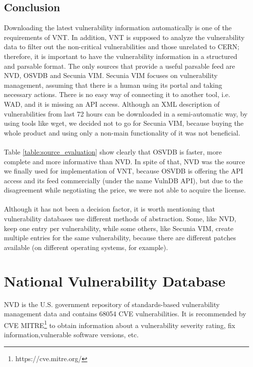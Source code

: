 \subsection{Conclusion}
Downloading the latest vulnerability information automatically is one of the requirements of VNT. In addition, VNT is supposed to analyze the vulnerability data to filter out the non-critical vulnerabilities and those unrelated to CERN; therefore, it is important to have the vulnerability information in a structured and parsable format. 
The only sources that provide a useful parsable feed are NVD, OSVDB and Secunia VIM. Secunia VIM focuses on vulnerability management, assuming that there is a human using its portal and taking necessary actions. There is no easy way of connecting it to another tool, i.e. WAD, and it is missing an API access. Although an XML description of vulnerabilities from last 72 hours can be downloaded in a semi-automatic way, by using tools like wget, we decided not to go for Secunia VIM, because buying the whole product and using only a non-main functionality of it was not beneficial.
\paragraph{}
Table \ref{table:source_evaluation} show clearly that OSVDB is faster, more complete and more informative than NVD. In spite of that, NVD was the source we finally used for implementation of VNT, because OSVDB is offering the API access and its feed commercially (under the name VulnDB API), but due to the disagreement while negotiating the price, we were not able to acquire the license.
\paragraph{}
Although it has not been a decision factor, it is worth mentioning that vulnerability databases use different methods of abstraction. Some, like NVD, keep one entry per vulnerability, while some others, like Secunia VIM, create multiple entries for the same vulnerability, because there are different patches available (on different operating systems, for example).

\section{National Vulnerability Database}
NVD is the U.S. government repository of standards-based vulnerability management data and contains 68054 CVE vulnerabilities. It is recommended by CVE MITRE\footnote{https://cve.mitre.org/} to obtain information about a vulnerability severity rating, fix information,vulnerable software versions, etc. 
 
